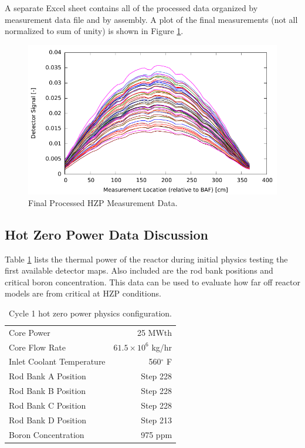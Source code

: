 A separate Excel sheet contains all of the processed data organized by measurement 
data file and by assembly.  A plot of the final measurements (not all normalized to sum of unity) is 
shown in Figure \ref{fig:splineunnorm}.
\begin{figure}[htbp]
    \centering
    \includegraphics{expdata/figs/spline_unnorm.pdf}
    \caption{Final Processed \ac{HZP} Measurement Data. \label{fig:splineunnorm}}
\end{figure}


\subsection{Hot Zero Power Data Discussion}
\label{sec:hzp_data_disc}

Table \ref{tbl:hzp_c1} lists the thermal power of the reactor during initial physics testing the first available detector maps. Also included are the rod bank positions and critical boron concentration. This data can be used to evaluate how far off reactor models are from critical at \ac{HZP} conditions.
\begin{table}[htp]
  \centering
  \caption{Cycle 1 hot zero power physics configuration.}
  \label{tbl:hzp_c1}
  \begin{tabular}{l r}
    \toprule
    Core Power & 25 MWth \\
    Core Flow Rate & $61.5\times10^6$ kg/hr \\ 
    Inlet Coolant Temperature & 560$^\circ$ F \\
    Rod Bank A Position & Step 228 \\
    Rod Bank B Position & Step 228 \\
    Rod Bank C Position & Step 228 \\
    Rod Bank D Position & Step 213 \\
    Boron Concentration & 975 \acs{ppm} \\
    \bottomrule
  \end{tabular}
\end{table}

